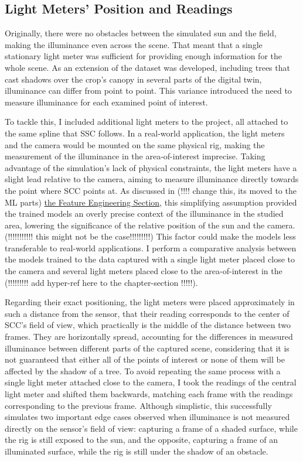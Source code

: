 \subsection {Light Meters' Position and Readings}

Originally, there were no obstacles between the simulated sun and the field, making the illuminance even across the scene. That meant that a single stationary light meter was sufficient for providing enough information for the whole scene. As an extension of the dataset was developed, including trees that cast shadows over the crop's canopy in several parts of the digital twin, illuminance can differ from point to point. This variance introduced the need to measure illuminance for each examined point of interest. 

To tackle this, I included additional light meters to the project, all attached to the same spline that SSC follows. In a real-world application, the light meters and the camera would be mounted on the same physical rig, making the measurement of the illuminance in the area-of-interest imprecise. Taking advantage of the simulation's lack of physical constraints, the light meters have a slight lead relative to the camera, aiming to measure illuminance directly towards the point where SCC points at. As discussed in (!!!! change this, its moved to the ML parts) \hyperref[feature-engineering]{the Feature Engineering Section}, this simplifying assumption provided the trained models an overly precise context of the illuminance in the studied area, lowering the significance of the relative position of the sun and the camera. (!!!!!!!!!!! this might not be the case!!!!!!!!!) This factor could make the models less transferable to real-world applications. I perform a comparative analysis between the models trained to the data captured with a single light meter placed close to the camera and several light meters placed close to the area-of-interest in the (!!!!!!!!! add hyper-ref here to the chapter-section !!!!!).

Regarding their exact positioning, the light meters were placed approximately in such a distance from the sensor, that their reading corresponds to the center of SCC's field of view, which practically is the middle of the distance between two frames. They are horizontally spread, accounting for the differences in measured illuminance between different parts of the captured scene, considering that it is not guaranteed that either all of the points of interest or none of them will be affected by the shadow of a tree. To avoid repeating the same process with a single light meter attached close to the camera, I took the readings of the central light meter and shifted them backwards, matching each frame with the readings corresponding to the previous frame. Although simplistic, this successfully simulates two important edge cases observed when illuminance is not measured directly on the sensor's field of view: capturing a frame of a shaded surface, while the rig is still exposed to the sun, and the opposite, capturing a frame of an illuminated surface, while the rig is still under the shadow of an obstacle.

